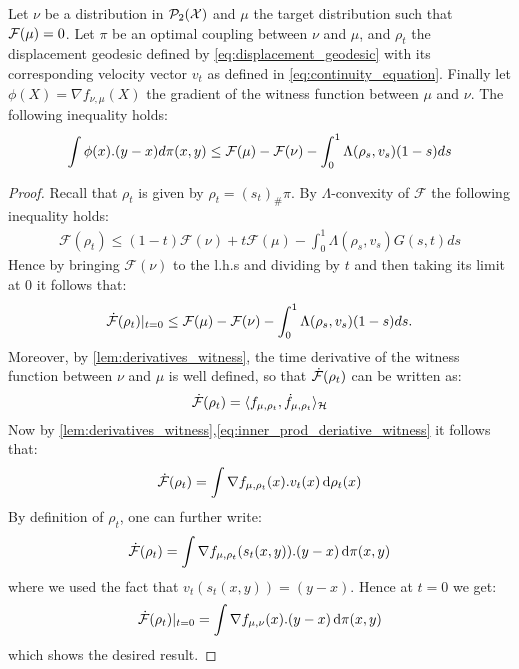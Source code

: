 \begin{lemma}	\label{lem:grad_flow_lambda_version}
Let $\nu$ be a distribution in $\mathcal{P}_2({{\mathcal X}})$ and $\mu$ the target distribution such that ${{\mathcal F}}(\mu)=0$.  Let $\pi$ be an optimal coupling between $\nu$ and $\mu$, and $\rho_t$ the displacement geodesic defined by \cref{eq:displacement_geodesic} with its corresponding velocity vector  $v_t$ as defined in \cref{eq:continuity_equation}. Finally let $\phi(X)=\nabla f_{\nu,\mu}(X)$ the gradient of the witness function between $\mu$ and $\nu$. The following inequality holds: 
\begin{align*}
	\int \phi(x).(y-x) d\pi(x,y)
	\leq
	{{\mathcal F}}(\mu)- {{\mathcal F}}(\nu) -\int_0^1 \Lambda(\rho_s,v_s)(1-s)ds
\end{align*}

\end{lemma}
\begin{proof}
Recall that $\rho_t$ is given by $\rho_t = (s_t)_{\#}\pi$. By $\Lambda$-convexity of $\mathcal{F}$ the following inequality holds:
	\begin{align*}
		\mathcal{F}(\rho_{t})\leq (1-t)\mathcal{F}(\nu)+t \mathcal{F}(\mu) - \int_0^1 \Lambda(\rho_s,v_s)G(s,t)ds
	\end{align*}
	Hence by bringing $\mathcal{F}(\nu)$ to the l.h.s and dividing by $t$ and then taking its limit at $0$ it follows that:
	\begin{align*}
	\dot{{{\mathcal F}}}(\rho_t)\vert_{t=0}\leq \mathcal	{F}(\mu)-\mathcal{F}(\nu)-\int_0^1 \Lambda(\rho_s,v_s)(1-s)ds.	
	\end{align*}
	Moreover, by \cref{lem:derivatives_witness}, the time derivative of the witness function between $\nu$ and $\mu$ is well defined, so that $\dot{{{\mathcal F}}}(\rho_t)$ can be written as:
	\[
	\dot{{{\mathcal F}}}(\rho_t) = \langle f_{\mu,\rho_t},\dot{f}_{\mu,\rho_t} \rangle_{{{\mathcal H}}}
	\]
	Now by \cref{lem:derivatives_witness},\cref{eq:inner_prod_deriative_witness} it follows that:
\[
\dot{{{\mathcal F}}}(\rho_t) = \int \nabla f_{\mu,\rho_t}(x).v_t(x)\mathop{}\!\mathrm{d} \rho_t(x)
\]
By definition of $\rho_t$,  one can further write:
\[
\dot{{{\mathcal F}}}(\rho_t) = \int \nabla f_{\mu,\rho_t}(s_t(x,y)).(y-x)\mathop{}\!\mathrm{d} \pi(x,y)
\]
where we used the fact that $v_t(s_t(x,y))=(y-x)$. Hence at $t=0$ we get:
\[
\dot{{{\mathcal F}}}(\rho_t)\vert_{t=0} = \int \nabla f_{\mu,\nu}(x).(y-x)\mathop{}\!\mathrm{d} \pi(x,y)
\]
which shows the desired result.
\end{proof}







